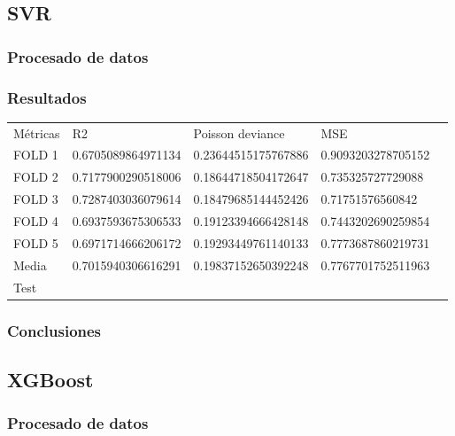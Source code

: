 \subsection{SVR}
\subsubsection{Procesado de datos}
\subsubsection{Resultados}
\begin{table}[htbp]
    \begin{tabular}{|l|l|l|l|l}
    \cline{1-4}
    Métricas & R2                 & Poisson deviance    & MSE                \\ \cline{1-4}
    FOLD 1   & 0.6705089864971134 & 0.23644515175767886 & 0.9093203278705152 \\ \cline{1-4}
    FOLD 2   & 0.7177900290518006 & 0.18644718504172647 & 0.735325727729088  \\ \cline{1-4}
    FOLD 3   & 0.7287403036079614 & 0.18479685144452426 & 0.71751576560842   \\ \cline{1-4}
    FOLD 4   & 0.6937593675306533 & 0.19123394666428148 & 0.7443202690259854 \\ \cline{1-4}
    FOLD 5   & 0.6971714666206172 & 0.19293449761140133 & 0.7773687860219731 \\ \cline{1-4}
    Media    & 0.7015940306616291 & 0.19837152650392248 & 0.7767701752511963 \\ \cline{1-4}
    Test & & & \\ \cline{1-4}
    \end{tabular}
\end{table}
\subsubsection{Conclusiones}

\subsection{XGBoost}
\subsubsection{Procesado de datos}
